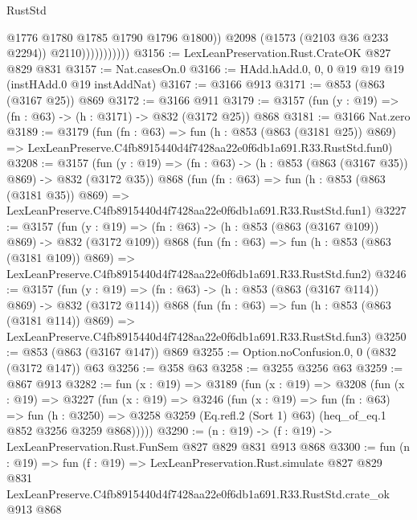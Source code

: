 \begin{lexlean}{RustStd}
\begin{coremodule}
                              @1776
                              @1780
                              @1785
                              @1790
                              @1796
                              @1800))
                          @2098
                          (@1573 (@2103 @36 @233 @2294))
                          @2110)))))))))))
@3156 := LexLeanPreservation.Rust.CrateOK @827 @829 @831
@3157 := Nat.casesOn.{0}
@3166 := HAdd.hAdd.{0, 0, 0} @19 @19 @19 (instHAdd.{0} @19 instAddNat)
@3167 := @3166 @913
@3171 := @853 (@863 (@3167 @25)) @869
@3172 := @3166 @911
@3179 := @3157 (fun (y : @19) => (fn : @63) -> (h : @3171) -> @832 (@3172 @25)) @868
@3181 := @3166 Nat.zero
@3189 := @3179
    (fun (fn : @63) =>
    fun (h : @853 (@863 (@3181 @25)) @869) =>
    LexLeanPreserve.C4fb8915440d4f7428aa22e0f6db1a691.R33.RustStd.fun0)
@3208 := @3157
    (fun (y : @19) => (fn : @63) -> (h : @853 (@863 (@3167 @35)) @869) -> @832 (@3172 @35))
    @868
    (fun (fn : @63) =>
    fun (h : @853 (@863 (@3181 @35)) @869) =>
    LexLeanPreserve.C4fb8915440d4f7428aa22e0f6db1a691.R33.RustStd.fun1)
@3227 := @3157
    (fun (y : @19) => (fn : @63) -> (h : @853 (@863 (@3167 @109)) @869) -> @832 (@3172 @109))
    @868
    (fun (fn : @63) =>
    fun (h : @853 (@863 (@3181 @109)) @869) =>
    LexLeanPreserve.C4fb8915440d4f7428aa22e0f6db1a691.R33.RustStd.fun2)
@3246 := @3157
    (fun (y : @19) => (fn : @63) -> (h : @853 (@863 (@3167 @114)) @869) -> @832 (@3172 @114))
    @868
    (fun (fn : @63) =>
    fun (h : @853 (@863 (@3181 @114)) @869) =>
    LexLeanPreserve.C4fb8915440d4f7428aa22e0f6db1a691.R33.RustStd.fun3)
@3250 := @853 (@863 (@3167 @147)) @869
@3255 := Option.noConfusion.{0, 0} (@832 (@3172 @147)) @63
@3256 := @358 @63
@3258 := @3255 @3256 @63
@3259 := @867 @913
@3282 := fun (x : @19) =>
  @3189
    (fun (x : @19) =>
    @3208
      (fun (x : @19) =>
      @3227
        (fun (x : @19) =>
        @3246
          (fun (x : @19) =>
          fun (fn : @63) =>
          fun (h : @3250) =>
          @3258 @3259 (Eq.refl.{2} (Sort 1) @63) (heq_of_eq.{1} @852 @3256 @3259 @868)))))
@3290 := (n : @19) -> (f : @19) -> LexLeanPreservation.Rust.FunSem @827 @829 @831 @913 @868
@3300 := fun (n : @19) =>
  fun (f : @19) =>
  LexLeanPreservation.Rust.simulate
    @827
    @829
    @831
    LexLeanPreserve.C4fb8915440d4f7428aa22e0f6db1a691.R33.RustStd.crate_ok
    @913
    @868
\end{coremodule}
\end{lexlean}
